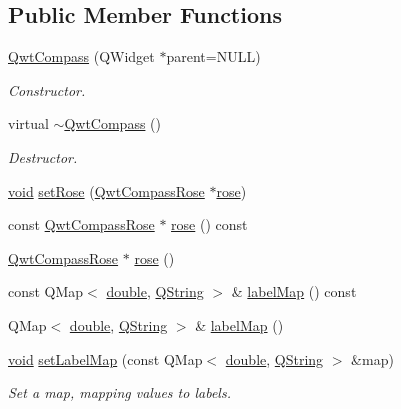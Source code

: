 \subsection*{Public Member Functions}
\begin{DoxyCompactItemize}
\item 
\hyperlink{class_qwt_compass_a05357e2950a3dc534e68e3c21f6c6b94}{Qwt\-Compass} (Q\-Widget $\ast$parent=N\-U\-L\-L)
\begin{DoxyCompactList}\small\item\em Constructor. \end{DoxyCompactList}\item 
virtual \hyperlink{class_qwt_compass_af6cc3b946f3761f7ce53d3a2ec000817}{$\sim$\-Qwt\-Compass} ()
\begin{DoxyCompactList}\small\item\em Destructor. \end{DoxyCompactList}\item 
\hyperlink{group___u_a_v_objects_plugin_ga444cf2ff3f0ecbe028adce838d373f5c}{void} \hyperlink{class_qwt_compass_a06456c0c52107bfa8b1d1267fba5b86f}{set\-Rose} (\hyperlink{class_qwt_compass_rose}{Qwt\-Compass\-Rose} $\ast$\hyperlink{class_qwt_compass_a7405a44d947e16f53b11dea4544d7683}{rose})
\item 
const \hyperlink{class_qwt_compass_rose}{Qwt\-Compass\-Rose} $\ast$ \hyperlink{class_qwt_compass_a7405a44d947e16f53b11dea4544d7683}{rose} () const 
\item 
\hyperlink{class_qwt_compass_rose}{Qwt\-Compass\-Rose} $\ast$ \hyperlink{class_qwt_compass_a99477d676bd866acd1a418615cba423b}{rose} ()
\item 
const Q\-Map$<$ \hyperlink{_super_l_u_support_8h_a8956b2b9f49bf918deed98379d159ca7}{double}, \hyperlink{group___u_a_v_objects_plugin_gab9d252f49c333c94a72f97ce3105a32d}{Q\-String} $>$ \& \hyperlink{class_qwt_compass_accc25cd9b9b23769711b7f04f9a4c464}{label\-Map} () const 
\item 
Q\-Map$<$ \hyperlink{_super_l_u_support_8h_a8956b2b9f49bf918deed98379d159ca7}{double}, \hyperlink{group___u_a_v_objects_plugin_gab9d252f49c333c94a72f97ce3105a32d}{Q\-String} $>$ \& \hyperlink{class_qwt_compass_a39b3cfa870ef0172b49d54fa2559a875}{label\-Map} ()
\item 
\hyperlink{group___u_a_v_objects_plugin_ga444cf2ff3f0ecbe028adce838d373f5c}{void} \hyperlink{class_qwt_compass_ab0f2460851db3d5b7169fe0991fdb945}{set\-Label\-Map} (const Q\-Map$<$ \hyperlink{_super_l_u_support_8h_a8956b2b9f49bf918deed98379d159ca7}{double}, \hyperlink{group___u_a_v_objects_plugin_gab9d252f49c333c94a72f97ce3105a32d}{Q\-String} $>$ \&map)
\begin{DoxyCompactList}\small\item\em Set a map, mapping values to labels. \end{DoxyCompactList}\end{DoxyCompactItemize}
